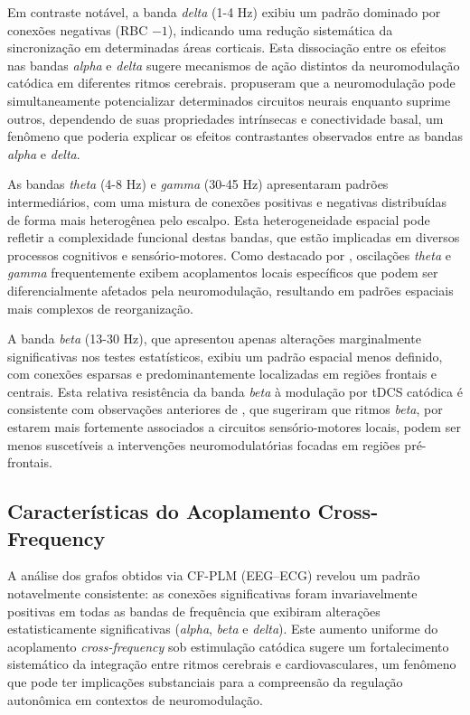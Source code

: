 Em contraste notável, a banda \emph{delta} (1-4 Hz) exibiu um padrão dominado por conexões negativas (RBC $-1$), indicando uma redução sistemática da sincronização em determinadas áreas corticais. Esta dissociação entre os efeitos nas bandas \emph{alpha} e \emph{delta} sugere mecanismos de ação distintos da neuromodulação catódica em diferentes ritmos cerebrais. \cite{scheler2019neuromodulation} propuseram que a neuromodulação pode simultaneamente potencializar determinados circuitos neurais enquanto suprime outros, dependendo de suas propriedades intrínsecas e conectividade basal, um fenômeno que poderia explicar os efeitos contrastantes observados entre as bandas \emph{alpha} e \emph{delta}.

As bandas \emph{theta} (4-8 Hz) e \emph{gamma} (30-45 Hz) apresentaram padrões intermediários, com uma mistura de conexões positivas e negativas distribuídas de forma mais heterogênea pelo escalpo. Esta heterogeneidade espacial pode refletir a complexidade funcional destas bandas, que estão implicadas em diversos processos cognitivos e sensório-motores. Como destacado por \cite{fries2015rhythms}, oscilações \emph{theta} e \emph{gamma} frequentemente exibem acoplamentos locais específicos que podem ser diferencialmente afetados pela neuromodulação, resultando em padrões espaciais mais complexos de reorganização.

A banda \emph{beta} (13-30 Hz), que apresentou apenas alterações marginalmente significativas nos testes estatísticos, exibiu um padrão espacial menos definido, com conexões esparsas e predominantemente localizadas em regiões frontais e centrais. Esta relativa resistência da banda \emph{beta} à modulação por tDCS catódica é consistente com observações anteriores de \cite{kunze2014high}, que sugeriram que ritmos \emph{beta}, por estarem mais fortemente associados a circuitos sensório-motores locais, podem ser menos suscetíveis a intervenções neuromodulatórias focadas em regiões pré-frontais.

\subsection{Características do Acoplamento Cross-Frequency}
A análise dos grafos obtidos via CF-PLM (EEG--ECG) revelou um padrão notavelmente consistente: as conexões significativas foram invariavelmente positivas em todas as bandas de frequência que exibiram alterações estatisticamente significativas (\emph{alpha}, \emph{beta} e \emph{delta}). Este aumento uniforme do acoplamento \textit{cross-frequency} sob estimulação catódica sugere um fortalecimento sistemático da integração entre ritmos cerebrais e cardiovasculares, um fenômeno que pode ter implicações substanciais para a compreensão da regulação autonômica em contextos de neuromodulação.

